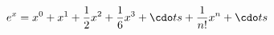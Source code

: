 \documentclass[preview]{standalone}
\begin{document}
\begin{align*}
e ^ x  =  x ^0 +  x ^ 1  + \frac { 1 } { 2 }   x ^2 + \frac { 1 } { 6 }   x ^3 + \cdo t s + \frac { 1 } { n! }   x ^n + \cdo t s
\end{align*}
\end{document}
